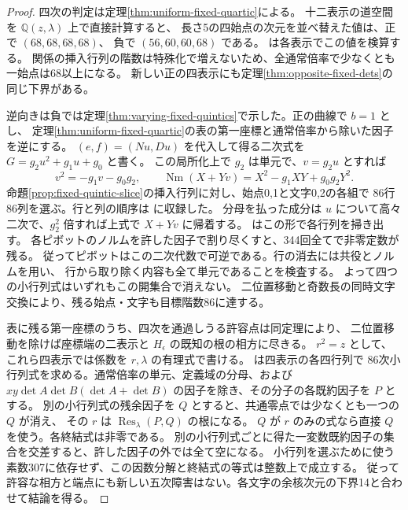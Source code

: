 \begin{proof}
四次の判定は定理\ref{thm:uniform-fixed-quartic}による。
十二表示の道空間を $\mathbb Q(z,\lambda)$ 上で直接計算すると、
長さ5の四始点の次元を並べ替えた値は、正で $(68,68,68,68)$、
負で $(56,60,60,68)$ である。
 は各表示でこの値を検算する。
関係の挿入行列の階数は特殊化で増えないため、全通常倍率で少なくとも一始点は68以上になる。
新しい正の四表示にも定理\ref{thm:opposite-fixed-dets}の同じ下界がある。

逆向きは負では定理\ref{thm:varying-fixed-quintics}で示した。正の曲線で $b=1$ とし、
定理\ref{thm:uniform-fixed-quartic}の表の第一座標と通常倍率から除いた因子を逆にする。
$(e,f)=(Nu,Du)$ を代入して得る二次式を $G=g_2u^2+g_1u+g_0$ と書く。
この局所化上で $g_2$ は単元で、$v=g_2u$ とすれば
\[
 v^2=-g_1v-g_0g_2,\qquad
 \operatorname{Nm}(X+Yv)=X^2-g_1XY+g_0g_2Y^2 .
\]
命題\ref{prop:fixed-quintic-slice}の挿入行列に対し、始点0,1と文字0,2の各組で
86行86列を選ぶ。行と列の順序は
 に収録した。
分母を払った成分は $u$ について高々二次で、$g_2^2$ 倍すれば上式で $X+Yv$ に帰着する。
 はこの形で各行列を掃き出す。
各ピボットのノルムを許した因子で割り尽くすと、344回全てで非零定数が残る。
従ってピボットはこの二次代数で可逆である。行の消去には共役とノルムを用い、
行から取り除く内容も全て単元であることを検査する。
よって四つの小行列式はいずれもこの開集合で消えない。
二位置移動と奇数長の同時文字交換により、残る始点・文字も目標階数86に達する。

表に残る第一座標のうち、四次を通過しうる許容点は同定理により、
二位置移動を除けば座標端の二表示と $H_\epsilon$ の既知の根の相方に尽きる。
$r^2=z$ として、これら四表示では係数を $r,\lambda$ の有理式で書ける。
 は四表示の各四行列で
86次小行列式を求める。通常倍率の単元、定義域の分母、および
$xy\det A\det B(\det A+\det B)$ の因子を除き、その分子の各既約因子を $P$ とする。
別の小行列式の残余因子を $Q$ とすると、共通零点では少なくとも一つの $Q$ が消え、
その $r$ は $\operatorname{Res}_\lambda(P,Q)$ の根になる。
$Q$ が $r$ のみの式なら直接 $Q$ を使う。各終結式は非零である。
別の小行列式ごとに得た一変数既約因子の集合を交差すると、許した因子の外では全て空になる。
小行列を選ぶために使う素数307に依存せず、この因数分解と終結式の等式は整数上で成立する。
従って許容な相方と端点にも新しい五次障害はない。各文字の余核次元の下界14と合わせて結論を得る。
\end{proof}
